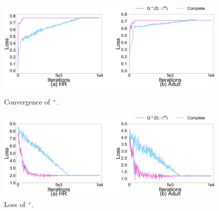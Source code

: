 \begin{figure}[t]   
	\centering
	\begin{minipage}[t]{0.49\textwidth}
		\centering
		\includegraphics[width=\columnwidth]{figs/G+_a}
		\caption{Convergence of \ours$^+$.}
		\label{fig:converge_G+}
	\end{minipage}
	\begin{minipage}[t]{0.49\textwidth}
		\centering
		\includegraphics[width=\columnwidth]{figs/G+}
		\caption{Loss of \ours$^+$.}
		\label{fig:real_loss_G+}
	\end{minipage}
	\vspace*{-1em}   
\end{figure}





